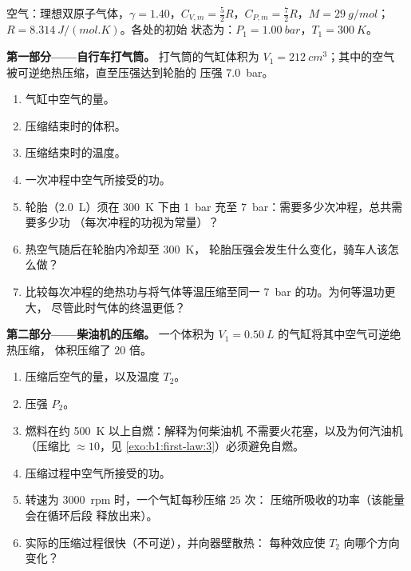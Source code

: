 \begin{problem}
\label{pb:b1:first-law:1}
空气：理想双原子气体，$\gamma = 1.40$，$C_{V,m} = \tfrac52 R$，$C_{P,m} =
\tfrac72 R$，$M = \qty{29}{g/mol}$；$R = \qty{8.314}{J/(mol.K)}$。各处的初始
状态为：$P_1 = \qty{1.00}{bar}$，$T_1 = \qty{300}{K}$。

\medskip
\noindent\textbf{第一部分——自行车打气筒。}
打气筒的气缸体积为 $V_1 = \qty{212}{cm^3}$；其中的空气
被可逆绝热压缩，直至压强达到轮胎的
压强 \qty{7.0}{bar}。
\begin{enumerate}
  \item 气缸中空气的量。
  \item 压缩结束时的体积。
  \item 压缩结束时的温度。
  \item 一次冲程中空气所接受的功。
  \item 轮胎（\qty{2.0}{L}）须在 \qty{300}{K} 下由 \qty{1}{bar} 充至
        \qty{7}{bar}：需要多少次冲程，总共需要多少功
        （每次冲程的功视为常量）？
  \item 热空气随后在轮胎内冷却至 \qty{300}{K}，
        轮胎压强会发生什么变化，骑车人该怎么做？
  \item 比较每次冲程的绝热功与将气体等温压缩至同一
        \qty{7}{bar} 的功。为何等温功更大，
        尽管此时气体的终温更低？
\end{enumerate}

\medskip
\noindent\textbf{第二部分——柴油机的压缩。}
一个体积为 $V_1 = \qty{0.50}{L}$ 的气缸将其中空气可逆绝热压缩，
体积压缩了 $20$ 倍。
\begin{enumerate}[resume]
  \item 压缩后空气的量，以及温度 $T_2$。
  \item 压强 $P_2$。
  \item 燃料在约 \qty{500}{K} 以上自燃：解释为何柴油机
        不需要火花塞，以及为何汽油机（压缩比
        $\approx 10$，见 \cref{exo:b1:first-law:3}）必须避免自燃。
  \item 压缩过程中空气所接受的功。
  \item 转速为 \qty{3000}{rpm} 时，一个气缸每秒压缩 $25$ 次：
        压缩所吸收的功率（该能量会在循环后段
        释放出来）。
  \item 实际的压缩过程很快（不可逆），并向器壁散热：
        每种效应使 $T_2$ 向哪个方向变化？
\end{enumerate}


\end{problem}
